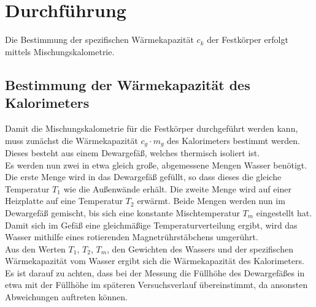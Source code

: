\section{Durchführung}
\label{sec:Durchführung}

Die Bestimmung der spezifischen Wärmekapazität $c_k$ der Festkörper erfolgt mittels Mischungskalometrie.
\subsection{Bestimmung der Wärmekapazität des Kalorimeters}
Damit die Mischungskalometrie für die Festkörper durchgeführt werden kann, muss zunächst die Wärmekapazität $c_g \cdot m_g$ des Kalorimeters bestimmt werden.
Dieses besteht aus einem Dewargefäß, welches thermisch isoliert ist. \\
Es werden nun zwei in etwa gleich große, abgemessene Mengen Wasser benötigt.
Die erste Menge wird in das Dewargefäß gefüllt, so dass dieses die gleiche Temperatur $T_1$ wie die Außenwände erhält.
Die zweite Menge wird auf einer Heizplatte auf eine Temperatur $T_2$ erwärmt.
Beide Mengen werden nun im Dewargefäß gemischt, bis sich eine konstante Mischtemperatur $T_m$ eingestellt hat.
Damit sich im Gefäß eine gleichmäßige Temperaturverteilung ergibt, wird das Wasser mithilfe eines rotierenden Magnetrührstäbchens umgerührt. \\
Aus den Werten $T_1$, $T_2$, $T_m$, den Gewichten des Wassers und der spezifischen Wärmekapazität vom Wasser ergibt sich die Wärmekapazität des Kalorimeters. \\
Es ist darauf zu achten, dass bei der Messung die Füllhöhe des Dewargefäßes in etwa mit der Füllhöhe im späteren Versuchsverlauf übereinstimmt, da ansonsten Abweichungen auftreten können.

